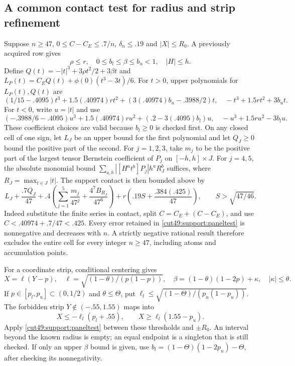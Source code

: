 \documentclass[11pt,a4paper]{article}
\numberwithin{equation}{section}
\theoremstyle{definition}
\theoremstyle{remark}
\begin{document}
\subsection{A common contact test for radius and strip refinement}
\label{cut49:support:panels}
Suppose $n\ge47$, $0\le C-C_E\le.7/n$, $\delta_n\le.19$ and
$|X|\le R_0$. A previously acquired row gives
\[
 \rho\le r,\quad 0\le b_l\le\beta\le b_u<1,\quad |H|\le h.
\]
Define $Q(t)=-|t|^3+3\rho t^2/2+3\beta t$ and
$L_P(t)=C_EQ(t)+\phi(0)(t^3-3t)/6$.
For $t>0$, upper polynomials for $L_P(t),Q(t)$ are
\[
 (1/15-.4095)t^3+1.5(.40974)rt^2+(3(.40974)b_u-.3988/2)t,
 \quad -t^3+1.5rt^2+3b_ut.
\]
For $t<0$, write $u=|t|$ and use
\[
 (-.3988/6-.4095)u^3+1.5(.40974)ru^2+(.2-3(.4095)b_l)u,
 \quad -u^3+1.5ru^2-3b_lu.
\]
These coefficient choices are valid because $b_l\ge0$ is checked first.
On any closed cell of one sign, let $L_J$ be an upper bound for the
first polynomial and let $Q_J\ge0$ bound the positive part of the second.
For $j=1,2,3$, take $m_j$ to be the positive part of the largest tensor
Bernstein coefficient of $P_j$ on $[-h,h]\times J$. For $j=4,5$, the
absolute monomial bound
$\sum_{a,b}|[H^at^b]P_j|h^aR_J^b$ suffices, where
$R_J=\max_{t\in J}|t|$. The support contact is then bounded above by
\begin{equation}\label{cut49:support:paneltest}
 L_J+\frac{.7Q_J}{47}
 +.4\left(\sum_{j=1}^5\frac{m_j}{47^j}
                +\frac{4^7B_{R_J}}{47^6}\right)
 +r\left(.19S+\frac{.384(.425)}{47}\right),
 \qquad S>\sqrt{47/46}.
\end{equation}
Indeed substitute the finite series in contact, split $C=C_E+(C-C_E)$,
and use $C<.40974+.7/47<.425$. Every error retained in
\eqref{cut49:support:paneltest} is nonnegative and decreases with $n$.
A strictly negative rational result therefore excludes the entire cell
for every integer $n\ge47$, including atoms and accumulation points.

For a coordinate strip, conditional centering gives
\[
 X=\ell(Y-p),\quad
 \ell=\sqrt{(1-\theta)/(p(1-p))},\quad
 \beta=(1-\theta)(1-2p)+\kappa,\quad |\kappa|\le\theta.
\]
If $p\in[p_l,p_u]\subset(0,1/2)$ and $\theta\le\Theta$, put
$\ell_l\le\sqrt{(1-\Theta)/(p_u(1-p_u))}$.
The forbidden strip $Y\notin(-.55,1.55)$ maps into
\[
 X\le-\ell_l(p_l+.55),\qquad X\ge\ell_l(1.55-p_u).
\]
Apply \eqref{cut49:support:paneltest} between these thresholds and $\pm R_0$.
An interval beyond the known radius is empty; an equal endpoint is a
singleton that is still checked. If only an upper $\beta$ bound is given,
use $b_l=(1-\Theta)(1-2p_u)-\Theta$, after checking its nonnegativity.
\end{document}
